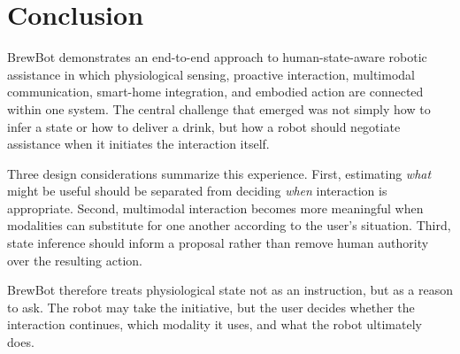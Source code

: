 \section{Conclusion}

BrewBot demonstrates an end-to-end approach to human-state-aware robotic
assistance in which physiological sensing, proactive interaction, multimodal
communication, smart-home integration, and embodied action are connected within
one system. The central challenge that emerged was not simply how to infer a
state or how to deliver a drink, but how a robot should negotiate assistance
when it initiates the interaction itself.

Three design considerations summarize this experience. First, estimating
\emph{what} might be useful should be separated from deciding \emph{when}
interaction is appropriate. Second, multimodal interaction becomes more
meaningful when modalities can substitute for one another according to the
user's situation. Third, state inference should inform a proposal rather than
remove human authority over the resulting action.

BrewBot therefore treats physiological state not as an instruction, but as a
reason to ask. The robot may take the initiative, but the user decides whether
the interaction continues, which modality it uses, and what the robot ultimately
does.
